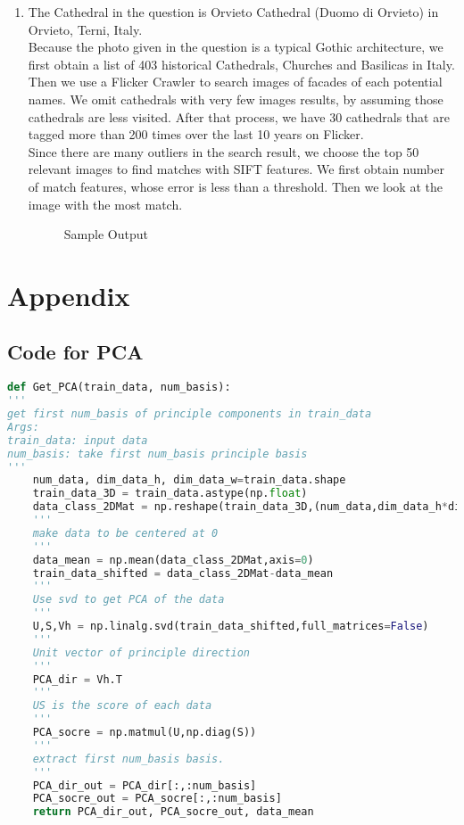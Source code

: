 \documentclass[12pt]{article}
\begin{document}
\begin{enumerate}
\begin{enumerate}
	\end{enumerate}

	\item The Cathedral in the question is Orvieto Cathedral (Duomo di Orvieto) in Orvieto, Terni, Italy.\\ 
	Because the photo given in the question is a typical Gothic architecture, we first obtain a list of 403 historical Cathedrals, Churches and Basilicas in Italy. Then we use a Flicker Crawler to search images of facades of each potential names. We omit cathedrals with very few images results, by assuming those cathedrals are less visited. After that process, we have 30 cathedrals that are tagged more than 200 times over the last 10 years on Flicker.\\
	Since there are many outliers in the search result, we choose the top 50 relevant images to find matches with SIFT features. We first obtain number of match features, whose error is less than a threshold. Then we look at the image with the most match. \\
	\begin{figure}[H]
		\centering
		\caption{Sample Output}
	\end{figure}
	
	
	\end{enumerate}
	\pagebreak
	\section*{Appendix}
	\subsection*{Code for PCA}
	\begin{lstlisting}[language=Python]
def Get_PCA(train_data, num_basis):
'''
get first num_basis of principle components in train_data
Args:
train_data: input data
num_basis: take first num_basis principle basis
'''
	num_data, dim_data_h, dim_data_w=train_data.shape
	train_data_3D = train_data.astype(np.float)
	data_class_2DMat = np.reshape(train_data_3D,(num_data,dim_data_h*dim_data_w))
	'''
	make data to be centered at 0
	'''
	data_mean = np.mean(data_class_2DMat,axis=0)
	train_data_shifted = data_class_2DMat-data_mean
	'''
	Use svd to get PCA of the data
	'''
	U,S,Vh = np.linalg.svd(train_data_shifted,full_matrices=False)
	'''
	Unit vector of principle direction
	'''
	PCA_dir = Vh.T
	'''
	US is the score of each data
	'''
	PCA_socre = np.matmul(U,np.diag(S))
	'''
	extract first num_basis basis.
	'''
	PCA_dir_out = PCA_dir[:,:num_basis]
	PCA_socre_out = PCA_socre[:,:num_basis]
	return PCA_dir_out, PCA_socre_out, data_mean
	\end{lstlisting}
	
\end{document}

